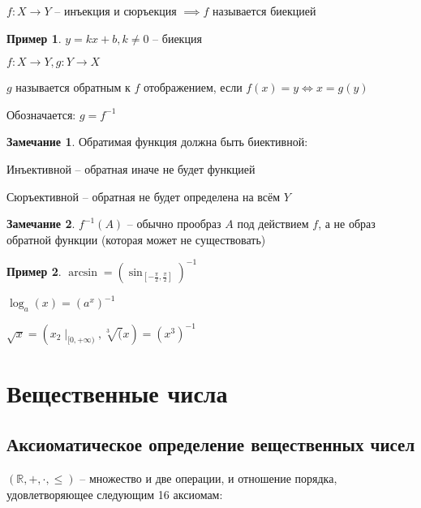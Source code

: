 \documentclass{book}
\newcommand\R{\ensuremath{\mathbb{R}}}
\theoremstyle{definition}
\newtheorem*{note}{Замечание}
\newtheorem*{example}{Пример}
\begin{document}
    \begin{definition}[биективность]
        $f:X\to Y$ -- инъекция и сюръекция $\implies f$ называется биекцией
    \end{definition}

    \begin{example}
        $y = kx+b, k\neq 0$ -- биекция
    \end{example}

    \begin{definition}
        $f:X\to Y, g:Y\to X$

        $g$ называется обратным к $f$ отображением, если $f(x) = y \iff  x = g(y)$

        Обозначается: $g = f^{-1}$
    \end{definition}
    \begin{note}
        Обратимая функция должна быть биективной:
        
        Инъективной -- обратная иначе не будет функцией

        Сюръективной -- обратная не будет определена на всём $Y$
    \end{note}
    \begin{note}
        $f^{-1}(A)$ -- обычно прообраз $A$ под действием $f$, а не образ обратной функции (которая может не существовать)
   \end{note}

   \begin{example}
       $\arcsin = (\sin _{[-\frac{\pi}{2}, \frac{\pi}{2}]  })^{-1}$

       $\log_a(x) = (a^x)^{-1}$

       $\sqrt{x} = (x_{2}\mid_{[0,+\infty )} , \sqrt[3](x) = (x^3)^{-1} $
   \end{example}
   \section{Вещественные числа}
    \subsection{Аксиоматическое определение вещественных чисел}

        $(\R, +, \cdot, \leqslant )$ -- множество и две операции, и отношение порядка, удовлетворяющее следующим 16 аксиомам:
        
\end{document}
